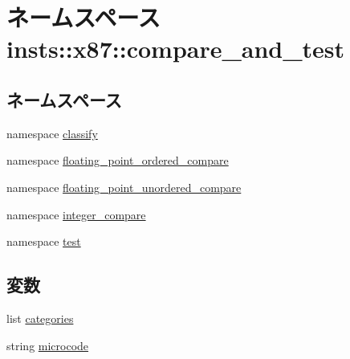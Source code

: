 \hypertarget{namespaceinsts_1_1x87_1_1compare__and__test}{
\section{ネームスペース insts::x87::compare\_\-and\_\-test}
\label{namespaceinsts_1_1x87_1_1compare__and__test}
}
\subsection*{ネームスペース}
\begin{DoxyCompactItemize}
\item 
namespace \hyperlink{namespaceinsts_1_1x87_1_1compare__and__test_1_1classify}{classify}
\item 
namespace \hyperlink{namespaceinsts_1_1x87_1_1compare__and__test_1_1floating__point__ordered__compare}{floating\_\-point\_\-ordered\_\-compare}
\item 
namespace \hyperlink{namespaceinsts_1_1x87_1_1compare__and__test_1_1floating__point__unordered__compare}{floating\_\-point\_\-unordered\_\-compare}
\item 
namespace \hyperlink{namespaceinsts_1_1x87_1_1compare__and__test_1_1integer__compare}{integer\_\-compare}
\item 
namespace \hyperlink{namespaceinsts_1_1x87_1_1compare__and__test_1_1test}{test}
\end{DoxyCompactItemize}
\subsection*{変数}
\begin{DoxyCompactItemize}
\item 
list \hyperlink{namespaceinsts_1_1x87_1_1compare__and__test_a273cf0f1630af14c1582f05e53354a55}{categories}
\item 
string \hyperlink{namespaceinsts_1_1x87_1_1compare__and__test_a770f11a173e99389a8802f0107ed8f52}{microcode}
\end{DoxyCompactItemize}


